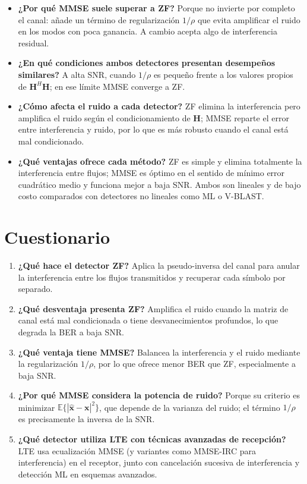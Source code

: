 \documentclass[11pt,a4paper]{article}
\begin{document}
\begin{itemize}
  \item \textbf{¿Por qué MMSE suele superar a ZF?} Porque no invierte por completo el canal:
        añade un término de regularización $1/\rho$ que evita amplificar el ruido en los
        modos con poca ganancia. A cambio acepta algo de interferencia residual.
  \item \textbf{¿En qué condiciones ambos detectores presentan desempeños similares?} A alta
        SNR, cuando $1/\rho$ es pequeño frente a los valores propios de
        $\mathbf{H}^{H}\mathbf{H}$; en ese límite MMSE converge a ZF.
  \item \textbf{¿Cómo afecta el ruido a cada detector?} ZF elimina la interferencia pero
        amplifica el ruido según el condicionamiento de $\mathbf{H}$; MMSE reparte el error
        entre interferencia y ruido, por lo que es más robusto cuando el canal está mal
        condicionado.
  \item \textbf{¿Qué ventajas ofrece cada método?} ZF es simple y elimina totalmente la
        interferencia entre flujos; MMSE es óptimo en el sentido de mínimo error cuadrático
        medio y funciona mejor a baja SNR. Ambos son lineales y de bajo costo comparados
        con detectores no lineales como ML o V-BLAST.
\end{itemize}

\section{Cuestionario}

\begin{enumerate}
  \item \textbf{¿Qué hace el detector ZF?} Aplica la pseudo-inversa del canal para anular la
        interferencia entre los flujos transmitidos y recuperar cada símbolo por separado.
  \item \textbf{¿Qué desventaja presenta ZF?} Amplifica el ruido cuando la matriz de canal
        está mal condicionada o tiene desvanecimientos profundos, lo que degrada la BER a
        baja SNR.
  \item \textbf{¿Qué ventaja tiene MMSE?} Balancea la interferencia y el ruido mediante la
        regularización $1/\rho$, por lo que ofrece menor BER que ZF, especialmente a baja
        SNR.
  \item \textbf{¿Por qué MMSE considera la potencia de ruido?} Porque su criterio es
        minimizar $\mathbb{E}\{|\hat{\mathbf{x}}-\mathbf{x}|^2\}$, que depende de la
        varianza del ruido; el término $1/\rho$ es precisamente la inversa de la SNR.
  \item \textbf{¿Qué detector utiliza LTE con técnicas avanzadas de recepción?} LTE usa
        ecualización MMSE (y variantes como MMSE-IRC para interferencia) en el receptor,
        junto con cancelación sucesiva de interferencia y detección ML en esquemas
        avanzados.
\end{enumerate}
\end{document}
